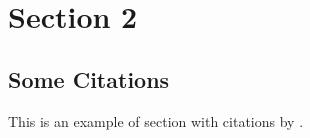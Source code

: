 \documentclass[11pt]{article}
\begin{document}
\lipsum[4-5] \\


\section{Section 2}

\subsection{Some Citations}

This is an example of section with citations by \citet{McAfee1992-sn} \citep[see][for citation in brackets]{McAfee1992-sn}. \lipsum

\end{document}
